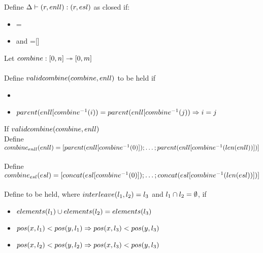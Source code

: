 \documentclass{article}
\begin{document}
Define $\Delta \vdash (r,enll) : (r, esl)$ as closed if:
\begin{itemize}
\item \Length{\ExampleNumberListList} = \Length{\ExampleStringList}
\item \Parented{\ExampleNumberListList} and \Parent{\ExampleNumberListList}=[]
\end{itemize}

Let $combine : [0,n] \twoheadrightarrow [0,m]$\\\\
Define $validcombine(combine,enll)$ to be held if 
\begin{itemize}
\item \Parented{\ExampleNumberListList[\Combine^{-1}(i)]}
\item $parent(enll[combine^{-1}(i)) = parent(enll[combine^{-1}(j)) \Rightarrow i = j$
\end{itemize}

If $validcombine(combine,enll)$\\
Define $combine_{enll}(enll) = [parent(enll[combine^{-1}(0)]) ; \ldots ; parent(enll[combine^{-1}(len(enll))])]$\\\\
Define $combine_{esl}(esl) = [concat(esl[combine^{-1}(0)]) ; \ldots ; concat(esl[combine^{-1}(len(esl))])]$\\\\

Define \Interleaving{\Interleave} to be held, where $interleave(l_1,l_2)=l_3$ and $l_1 \cap l_2 = \emptyset$, if\\
\begin{itemize}
\item $elements(l_1)\cup elements(l_2) = elements(l_3)$
\item $pos(x,l_1) < pos(y,l_1) \Rightarrow pos(x,l_3) < pos(y,l_3)$
\item $pos(x,l_2) < pos(y,l_2) \Rightarrow pos(x,l_3) < pos(y,l_3)$
\end{itemize}
\end{document}
